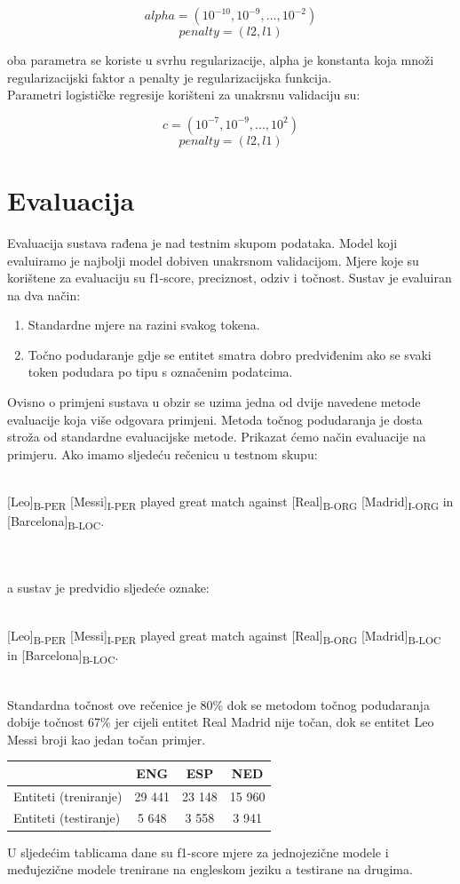 \documentclass[times, utf8, seminar]{fer}
\begin{document}
\[ alpha = (10^{-10}, 10^{-9}, ..., 10^{-2}) \]
\[ penalty = (l2, l1) \]

oba parametra se koriste u svrhu regularizacije,  alpha je konstanta koja množi regularizacijski faktor a penalty je regularizacijska funkcija.\\
Parametri logističke regresije korišteni za unakrsnu validaciju su:

\[ c = (10^{-7}, 10^{-9}, ..., 10^{2}) \]
\[ penalty = (l2, l1) \]
\chapter{Evaluacija}
Evaluacija sustava rađena je nad testnim skupom podataka. Model koji evaluiramo je najbolji model dobiven unakrsnom validacijom. Mjere koje su korištene za evaluaciju su f1-score, preciznost, odziv i točnost. Sustav je evaluiran na dva način:
\begin{enumerate}
\item Standardne mjere na razini svakog tokena.
\item Točno podudaranje gdje se entitet smatra dobro predviđenim ako se svaki token podudara po tipu s označenim podatcima.
\end{enumerate}

Ovisno o primjeni sustava u obzir se uzima jedna od dvije navedene metode evaluacije koja više odgovara primjeni. Metoda točnog podudaranja je dosta stroža od standardne evaluacijske metode. Prikazat ćemo način evaluacije na primjeru. Ako imamo sljedeću rečenicu u testnom skupu:\\\\
\centerline{[Leo]\textsubscript{B-PER} [Messi]\textsubscript{I-PER} played great match against [Real]\textsubscript{B-ORG} [Madrid]\textsubscript{I-ORG} in [Barcelona]\textsubscript{B-LOC}.}\\\\
a sustav je predvidio sljedeće oznake:\\\\
\centerline{[Leo]\textsubscript{B-PER} [Messi]\textsubscript{I-PER} played great match against [Real]\textsubscript{B-ORG} [Madrid]\textsubscript{B-LOC} in [Barcelona]\textsubscript{B-LOC}.}\\

Standardna točnost ove rečenice je 80\% dok se metodom točnog podudaranja dobije točnost 67\% jer cijeli entitet Real Madrid nije točan, dok se entitet Leo Messi broji kao jedan točan primjer.  

\begin{center}
\begin{tabular}{ lccc }
\hline
 & ENG & ESP & NED \\ 
\hline
Entiteti (treniranje) & 29 441 & 23 148 & 15 960 \\
Entiteti (testiranje) & 5 648 & 3 558 & 3 941 \\
\hline
\end{tabular}
\end{center}
\newpage
U sljedećim tablicama dane su f1-score mjere za jednojezične modele i međujezične modele trenirane na engleskom jeziku a testirane na drugima.
\end{document}
